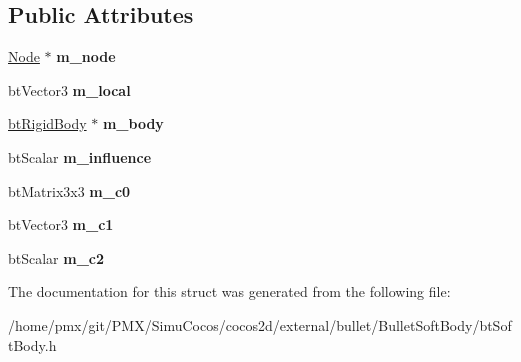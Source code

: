 \subsection*{Public Attributes}
\begin{DoxyCompactItemize}
\item 
\mbox{\label{structbtSoftBody_1_1Anchor_abc1bf9b55ed97026448d561a3fee9d8b}} 
\hyperlink{structbtSoftBody_1_1Node}{Node} $\ast$ {\bfseries m\+\_\+node}
\item 
\mbox{\label{structbtSoftBody_1_1Anchor_a06d5ececcb7018b282039a82f5061e4a}} 
bt\+Vector3 {\bfseries m\+\_\+local}
\item 
\mbox{\label{structbtSoftBody_1_1Anchor_a232e889f1d84f32b4f8d54d24baa1b18}} 
\hyperlink{classbtRigidBody}{bt\+Rigid\+Body} $\ast$ {\bfseries m\+\_\+body}
\item 
\mbox{\label{structbtSoftBody_1_1Anchor_a05a862b5fb1fe7d56ff50ff527f7beaf}} 
bt\+Scalar {\bfseries m\+\_\+influence}
\item 
\mbox{\label{structbtSoftBody_1_1Anchor_ad3928469ff917d5c03bbbbb1192026e5}} 
bt\+Matrix3x3 {\bfseries m\+\_\+c0}
\item 
\mbox{\label{structbtSoftBody_1_1Anchor_a0570748f1978b7ab7cd6cc30eb5f6715}} 
bt\+Vector3 {\bfseries m\+\_\+c1}
\item 
\mbox{\label{structbtSoftBody_1_1Anchor_a4cd6a20a7e31d879e510ffe6ff076537}} 
bt\+Scalar {\bfseries m\+\_\+c2}
\end{DoxyCompactItemize}


The documentation for this struct was generated from the following file\+:\begin{DoxyCompactItemize}
\item 
/home/pmx/git/\+P\+M\+X/\+Simu\+Cocos/cocos2d/external/bullet/\+Bullet\+Soft\+Body/bt\+Soft\+Body.\+h\end{DoxyCompactItemize}
